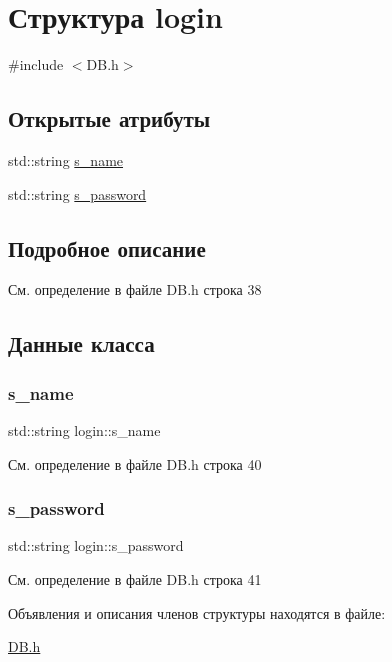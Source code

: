 \hypertarget{structlogin}{}\section{Структура login}
\label{structlogin}


{\ttfamily \#include $<$D\+B.\+h$>$}

\subsection*{Открытые атрибуты}
\begin{DoxyCompactItemize}
\item 
std\+::string \mbox{\hyperlink{structlogin_acf93d411362f367b1fb7c35337d0606d}{s\+\_\+name}}
\item 
std\+::string \mbox{\hyperlink{structlogin_a9c4b7efff9382117bd288f9cc42a4e28}{s\+\_\+password}}
\end{DoxyCompactItemize}


\subsection{Подробное описание}


См. определение в файле D\+B.\+h строка 38



\subsection{Данные класса}
\mbox{\label{structlogin_acf93d411362f367b1fb7c35337d0606d}} 
\subsubsection{\texorpdfstring{s\_name}{s\_name}}
{\footnotesize\ttfamily std\+::string login\+::s\+\_\+name}



См. определение в файле D\+B.\+h строка 40

\mbox{\label{structlogin_a9c4b7efff9382117bd288f9cc42a4e28}} 
\subsubsection{\texorpdfstring{s\_password}{s\_password}}
{\footnotesize\ttfamily std\+::string login\+::s\+\_\+password}



См. определение в файле D\+B.\+h строка 41



Объявления и описания членов структуры находятся в файле\+:\begin{DoxyCompactItemize}
\item 
\mbox{\hyperlink{_d_b_8h}{D\+B.\+h}}\end{DoxyCompactItemize}
